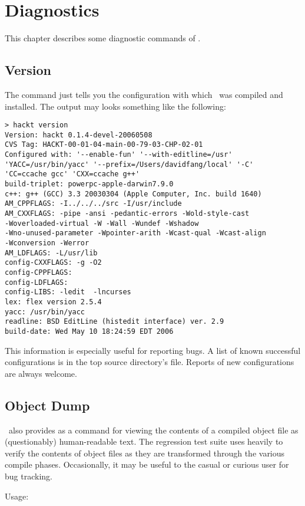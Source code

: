 
\chapter{Diagnostics}
\label{sec:diagnostics}

This chapter describes some diagnostic commands of \binhackt.  

\section{Version}
\label{sec:diagnostics:version}

The  command just tells you the configuration with which
\binhackt\ was compiled and installed.  
The output may looks something like the following:

\begin{verbatim}
> hackt version
Version: hackt 0.1.4-devel-20060508
CVS Tag: HACKT-00-01-04-main-00-79-03-CHP-02-01
Configured with: '--enable-fun' '--with-editline=/usr' 
'YACC=/usr/bin/yacc' '--prefix=/Users/davidfang/local' '-C' 
'CC=ccache gcc' 'CXX=ccache g++'
build-triplet: powerpc-apple-darwin7.9.0
c++: g++ (GCC) 3.3 20030304 (Apple Computer, Inc. build 1640)
AM_CPPFLAGS: -I../../../src -I/usr/include   
AM_CXXFLAGS: -pipe -ansi -pedantic-errors -Wold-style-cast 
-Woverloaded-virtual -W -Wall -Wundef -Wshadow 
-Wno-unused-parameter -Wpointer-arith -Wcast-qual -Wcast-align 
-Wconversion -Werror
AM_LDFLAGS: -L/usr/lib   
config-CXXFLAGS: -g -O2
config-CPPFLAGS: 
config-LDFLAGS: 
config-LIBS: -ledit  -lncurses 
lex: flex version 2.5.4
yacc: /usr/bin/yacc
readline: BSD EditLine (histedit interface) ver. 2.9
build-date: Wed May 10 18:24:59 EDT 2006
\end{verbatim}

This information is especially useful for reporting bugs.  
A list of known successful configurations is in the 
top source directory's  file.  
Reports of new configurations are always welcome.  

\section{Object Dump}
\label{sec:diagnostics:objdump}

\binhackt\ also provides  as a command for viewing 
the contents of a compiled object file as (questionably) human-readable text.  
The regression test suite uses  heavily to verify the
contents of object files as they are transformed through the various
compile phases.  
Occasionally, it may be useful to the casual or curious user for 
bug tracking.  

Usage: \binhackt\  

